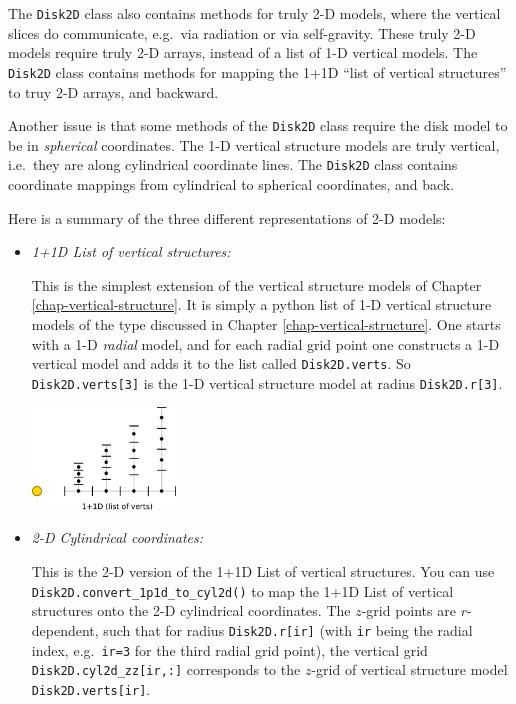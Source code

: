\documentclass{book}
\newcommand{\code}[1]{{\small\tt #1}}
\begin{document}
The \code{Disk2D} class also contains methods for truly 2-D models, where the
vertical slices do communicate, e.g.\ via radiation or via self-gravity. These
truly 2-D models require truly 2-D arrays, instead of a list of 1-D vertical
models. The \code{Disk2D} class contains methods for mapping the 1+1D ``list of
vertical structures'' to truy 2-D arrays, and backward.

Another issue is that some methods of the \code{Disk2D} class require the
disk model to be in {\em spherical} coordinates. The 1-D vertical structure
models are truly vertical, i.e.\ they are along cylindrical coordinate lines.
The \code{Disk2D} class contains coordinate mappings from cylindrical to
spherical coordinates, and back.

Here is a summary of the three different representations of 2-D models:
\begin{itemize}
\item {\em 1+1D List of vertical structures:}\\
  \parbox{0.6\textwidth}{This is the simplest extension of the vertical structure models of
  Chapter \ref{chap-vertical-structure}. It is simply a python list of
  1-D vertical structure models of the type discussed in 
  Chapter \ref{chap-vertical-structure}. One starts with a 1-D {\em radial}
  model, and for each radial grid point one constructs a 1-D vertical model
  and adds it to the list called \code{Disk2D.verts}. So
  \code{Disk2D.verts[3]} is the 1-D vertical structure model at radius
  \code{Disk2D.r[3]}.}
  \parbox{0.4\textwidth}{\centerline{\includegraphics[width=0.3\textwidth]{disklab_grid_1p1d.pdf}}}
  \newpage
\item {\em 2-D Cylindrical coordinates:}\\
  \parbox{0.6\textwidth}{This is the 2-D version of the 1+1D List of vertical structures.
  You can use \code{Disk2D.convert\_1p1d\_to\_cyl2d()} to map the 
  1+1D List of vertical structures onto the 2-D cylindrical coordinates.
  The $z$-grid points are $r$-dependent, such that for radius \code{Disk2D.r[ir]}
  (with \code{ir} being the radial index, e.g.\ \code{ir=3} for the third
  radial grid point), the vertical grid \code{Disk2D.cyl2d\_zz[ir,:]} corresponds
  to the $z$-grid of vertical structure model \code{Disk2D.verts[ir]}.
}
\end{itemize}
\end{document}
